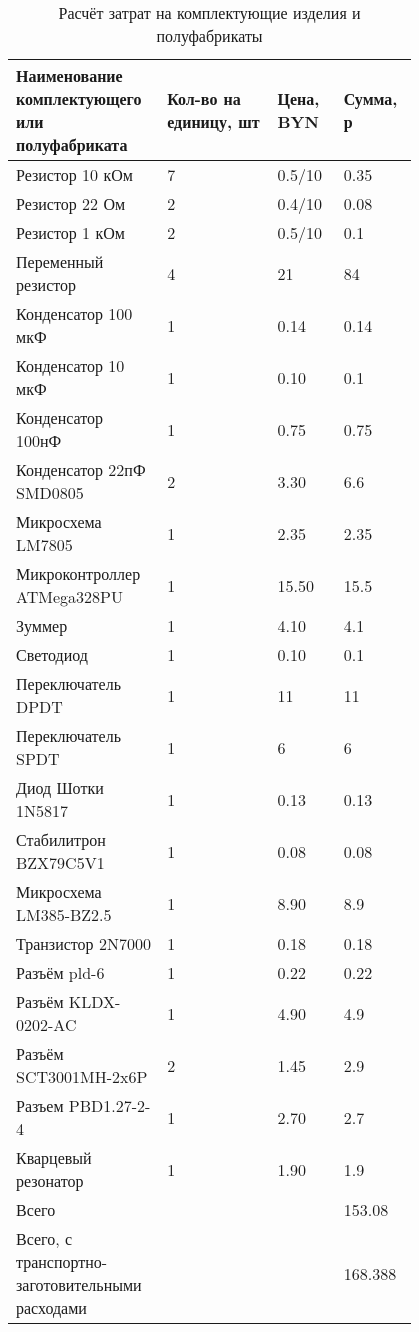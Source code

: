 \begin{table}[H]
  \caption{Расчёт затрат на комплектующие изделия и полуфабрикаты}
  \small
  \begin{tabular}{| p{0.25\linewidth} |  p{0.25\linewidth} |  p{0.15\linewidth} |  p{0.15\linewidth} |}
    \hline
Наименование комплектующего или полуфабриката & Кол-во на единицу, шт & Цена, BYN & Сумма, р\\[0pt]
\hline
  Резистор 10 кОм & 7 & 0.5/10 & 0.35 \\[0pt]
  \hline
  Резистор 22 Ом  & 2 & 0.4/10 & 0.08 \\[0pt]
  \hline
  Резистор 1 кОм  & 2 & 0.5/10 & 0.1\\[0pt]
  \hline
  Переменный резистор & 4 & 21 & 84\\[0pt]
  \hline
  Конденсатор 100 мкФ & 1 & 0.14 & 0.14\\[0pt]
  \hline
  Конденсатор 10 мкФ  & 1 & 0.10 & 0.1\\[0pt]
  \hline
  Конденсатор 100нФ & 1 & 0.75 & 0.75 \\[0pt]
  \hline
  Конденсатор 22пФ SMD0805 & 2 & 3.30 & 6.6\\[0pt]
  \hline
  Микросхема LM7805 & 1 & 2.35 & 2.35 \\[0pt]
  \hline
  Микроконтроллер ATMega328PU & 1 & 15.50 & 15.5 \\[0pt]
  \hline
  Зуммер & 1 & 4.10 & 4.1 \\[0pt]
  \hline
  Светодиод & 1 & 0.10 & 0.1 \\[0pt]
  \hline
  Переключатель DPDT & 1 & 11 & 11 \\[0pt]
  \hline
  Переключатель SPDT & 1 & 6 & 6\\[0pt]
  \hline
  Диод Шотки 1N5817 & 1 & 0.13 & 0.13 \\[0pt]
  \hline
  Стабилитрон BZX79C5V1 & 1 & 0.08 & 0.08 \\[0pt]
  \hline
  Микросхема LM385-BZ2.5 & 1 & 8.90 & 8.9\\[0pt]
  \hline
  Транзистор 2N7000 & 1 & 0.18 & 0.18 \\[0pt]
  \hline
  Разъём pld-6 & 1 & 0.22 & 0.22 \\[0pt]
  \hline
  Разъём KLDX-0202-AC & 1 & 4.90 & 4.9 \\[0pt]
  \hline
  Разъём SCT3001MH-2x6P & 2 & 1.45 & 2.9 \\[0pt]
  \hline
  Разъем PBD1.27-2-4 & 1 & 2.70 & 2.7 \\[0pt]
  \hline
  Кварцевый резонатор & 1 & 1.90 & 1.9\\[0pt]
  \hline
  Всего &  &  & 153.08\\[0pt]
  \hline
  Всего, с транспортно-заготовительными расходами &  &  & 168.388\\[0pt]
  \hline
\end{tabular}
\end{table}


